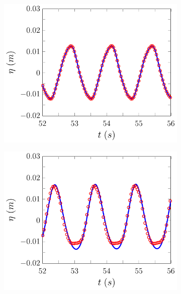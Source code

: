 \begin{figure}
	\centering
	\begin{subfigure}{0.5\textwidth}
		\includegraphics[width=\textwidth]{./chp6/figures/Experiment/Beji/sh/FDVMWG1.pdf}
		\vspace{0.5cm}
	\end{subfigure}%
	\begin{subfigure}{0.5\textwidth}
		\includegraphics[width=\textwidth]{./chp6/figures/Experiment/Beji/sh/FDVMWG2.pdf}
		\vspace{0.5cm}
	\end{subfigure}

\end{figure}
